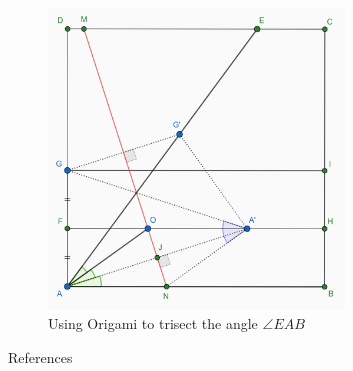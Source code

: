 \documentclass[handout]{beamer}
\begin{document}
    \begin{frame}
        \vspace{0.5em}
        \begin{figure}
        \begin{center}
            \includegraphics[width=0.7\textwidth]{trisection_origami_.png}
        \end{center}
        \vspace{-0.5em}
        \caption{Using Origami to trisect the angle $\angle EAB$}
        \label{fig:trisecting_angles_origami}
        \end{figure}
    \end{frame}


    \begin{frame}{References}
        \nocite{*}
        
        
    \end{frame}
\end{document}
